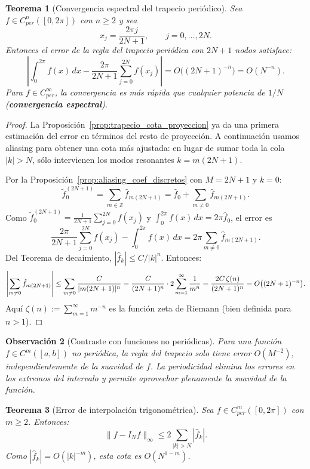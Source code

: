 \documentclass[a4paper,11pt]{report}
\newtheorem{theorem}{Teorema}[chapter]
\newtheorem{remark}[theorem]{Observación}
\begin{document}
\begin{theorem}[Convergencia espectral del trapecio periódico]\label{thm:trap_espectral}
Sea $f \in C^n_{per}([0,2\pi])$ con $n \geq 2$ y sea
\[
x_j=\frac{2\pi j}{2N+1},\qquad j=0,\dots,2N.
\]
Entonces el error de la regla del trapecio periódica con $2N+1$ nodos satisface:
\[
\left| \int_0^{2\pi} f(x)\,dx - \frac{2\pi}{2N+1}\sum_{j=0}^{2N} f(x_j) \right| = O\big((2N+1)^{-n}\big)=O(N^{-n}).
\]
Para $f \in C^\infty_{per}$, la convergencia es más rápida que cualquier potencia de $1/N$ (\textbf{convergencia espectral}).
\end{theorem}
\begin{proof}
La Proposición~\ref{prop:trapecio_cota_proyeccion} ya da una primera estimación del error en términos del resto de proyección. A continuación usamos aliasing para obtener una cota más ajustada: en lugar de sumar toda la cola $|k|>N$, sólo intervienen los modos resonantes $k=m(2N+1)$.

Por la Proposición~\ref{prop:aliasing_coef_discretos} con $M=2N+1$ y $k=0$:
\[
\tilde f_0^{(2N+1)}=\sum_{m\in\mathbb Z}\hat f_{m(2N+1)}=\hat f_0+\sum_{m\neq 0}\hat f_{m(2N+1)}.
\]
Como $\tilde f_0^{(2N+1)}=\frac{1}{2N+1}\sum_{j=0}^{2N}f(x_j)$ y $\int_0^{2\pi}f(x)\,dx=2\pi\hat f_0$, el error es
\[
\frac{2\pi}{2N+1}\sum_{j=0}^{2N} f(x_j) - \int_0^{2\pi}f(x)\,dx = 2\pi\sum_{m \neq 0} \hat{f}_{m(2N+1)}.
\]
Del Teorema de decaimiento, $|\hat{f}_k| \leq C/|k|^n$.  Entonces:
\[
\left|\sum_{m\neq 0}\hat{f}_{m(2N+1)}\right| \leq \sum_{m\neq 0}\frac{C}{|m(2N+1)|^n} = \frac{C}{(2N+1)^n}\cdot 2\sum_{m=1}^{\infty}\frac{1}{m^n} = \frac{2C\,\zeta(n)}{(2N+1)^n} = O\big((2N+1)^{-n}\big). \qedhere
\]
Aquí $\zeta(n):=\sum_{m=1}^{\infty}m^{-n}$ es la función zeta de Riemann (bien definida para $n>1$).
\end{proof}

\begin{remark}[Contraste con funciones no periódicas]
Para una función $f \in C^m([a,b])$ no periódica, la regla del trapecio solo tiene error $O(M^{-2})$, independientemente de la suavidad de $f$.  La periodicidad elimina los errores en los extremos del intervalo y permite aprovechar plenamente la suavidad de la función.
\end{remark}


\begin{theorem}[Error de interpolación trigonométrica]\label{thm:interp_error_fourier}
Sea $f \in C^m_{per}([0,2\pi])$ con $m \geq 2$. Entonces:
\[
\|f - I_N f\|_\infty \leq 2 \sum_{|k| > N} |\hat{f}_k|.
\]
Como $|\hat{f}_k| = O(|k|^{-m})$, esta cota es $O(N^{1-m})$.
\end{theorem}
\end{document}
